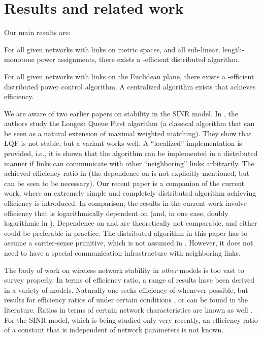 \documentclass[11pt]{amsart}
\begin{document}
\section{Results and related work}
\label{sec:results}
Our main results are:

\begin{theorem}
\label{mainth1}
For all given networks with links on metric spaces, and all sub-linear, length-monotone 
power assignments, there exists a -efficient distributed algorithm.
\end{theorem}


\begin{theorem}
\label{mainth2}
For all given networks with links on the Euclidean plane,
there exists a -efficient distributed power control algorithm.  A 
centralized algorithm exists that achieves
 efficiency.
\end{theorem}


We are aware of two earlier papers on stability in the SINR model.
In \cite{lqfmobihoc}, the authors study the Longest Queue First algorithm (a classical algorithm that can be seen as a natural extension of maximal weighted matching). They show that LQF is not stable, but a variant works well.
A ``localized'' implementation is provided, i.e., it is shown that the algorithm can be implemented in a distributed manner if links can communicate with
other ``neighboring'' links arbitrarily. The achieved efficiency ratio in
 (the dependence on  is not explicitly mentioned, but can be seen to be necessary). Our recent paper \cite{ciss12} is a companion of the current work, 
where an extremely simple and completely distributed algorithm achieving  efficiency is introduced.
In comparison, the results in the current work involve efficiency that is logarithmically dependent on  (and, in one case, doubly logarithmic in ). 
Dependence on  and  are theoretically not comparable, and either could be preferable in practice. The distributed algorithm in this paper has to assume
a carrier-sense primitive, which is not assumed in \cite{ciss12}. However, it does not need to have a special communication infrastructure with neighboring links.

The body of work on wireless network stability in \emph{other} models is too vast to survey properly. In terms of efficiency ratio, 
a range of results have been derived
in a variety of models. Naturally one seeks efficiency of  \cite{DBLP:conf/sigmetrics/ModianoSZ06} whenever
possible, but results for efficiency ratios of  under certain conditions \cite{secordorder}, or  \cite{bestInfocom08} can be found in the literature.
Ratios in terms of certain network characteristics are known as well \cite{bestInfocom08,lqfmobihoc}. 
For the SINR model, which is being studied only very recently, an efficiency ratio of a
constant that is independent of network parameters is not known. 
\end{document}
